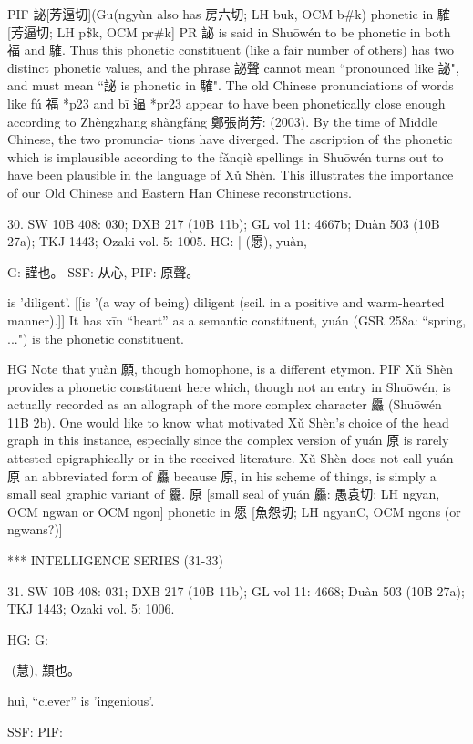 PIF 䛑[芳逼切](Gu(ngyùn also has 房六切; LH buk, OCM b\#k) phonetic in 䮤 [芳逼切; LH p\$k, OCM pr\#k]
PR 䛑 is said in Shuōwén to be phonetic in both 福 and 䮤. Thus this phonetic constituent (like a fair number of others) has two distinct phonetic values, and the phrase 䛑聲 cannot mean ``pronounced like 䛑", and must mean ``䛑 is phonetic in 䮤". The old Chinese pronunciations of words like fú 福 *p23 and bī 逼 *pr23 appear to have been phonetically close enough according to Zhèngzhāng shàngfáng 鄭張尚芳: (2003). By the time of Middle Chinese, the two pronuncia- tions have diverged. The ascription of the phonetic which is implausible according to the fǎnqiè spellings in Shuōwén turns out to have been plausible in the language of Xǔ Shèn. This illustrates the importance of our Old Chinese and Eastern Han Chinese reconstructions.


30. SW 10B 408: 030; DXB 217 (10B 11b); GL vol 11: 4667b; Duàn 503 (10B 27a); TKJ 1443; Ozaki vol. 5: 1005.
HG: | (愿), yuàn,

G:	謹也。
SSF: 从心,
PIF: 原聲。

is 'diligent'. [[is '(a way of being) diligent (scil. in a positive and warm-hearted manner).]]
It has xīn ``heart'' as a semantic constituent,
yuán (GSR 258a: ``spring, ...") is the phonetic constituent.

HG    Note that yuàn 願, though homophone, is a different etymon.
PIF Xǔ Shèn provides a phonetic constituent here which, though not an entry in Shuōwén, is actually recorded as an allograph of the more complex character 厵 (Shuōwén 11B 2b). One would like to know what motivated Xǔ Shèn's choice of the head graph in this instance, especially since the complex version of yuán 原 is rarely attested epigraphically or in the received literature.
    Xǔ Shèn does not call yuán 原 an abbreviated form of 厵 because 原, in his scheme of things, is simply a small seal graphic variant of 厵.
    原 [small seal of yuán 厵: 愚袁切; LH ngyan, OCM ngwan or OCM ngon] phonetic in 愿 [魚怨切; LH ngyanC, OCM ngons (or ngwans?)]

            *** INTELLIGENCE SERIES (31-33)

31. SW 10B 408: 031; DXB 217 (10B 11b); GL vol 11: 4668; Duàn 503 (10B 27a); TKJ 1443; Ozaki vol. 5: 1006.


HG:
G:

 (慧),
䫞也。


huì, ``clever'' is 'ingenious'.




SSF: PIF:

